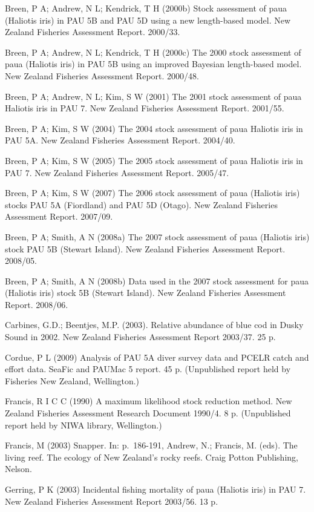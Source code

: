 \documentclass{mpi-plenary}
\theoremstyle{definition}
\theoremstyle{definition}
\theoremstyle{definition}
\theoremstyle{remark}
\begin{document}
Breen, P A; Andrew, N L; Kendrick, T H (2000b) Stock assessment of paua
(Haliotis iris) in PAU 5B and PAU 5D using a new length-based model. New
Zealand Fisheries Assessment Report. 2000/33.

Breen, P A; Andrew, N L; Kendrick, T H (2000c) The 2000 stock assessment
of paua (Haliotis iris) in PAU 5B using an improved Bayesian
length-based model. New Zealand Fisheries Assessment Report. 2000/48.

Breen, P A; Andrew, N L; Kim, S W (2001) The 2001 stock assessment of
paua Haliotis iris in PAU 7. New Zealand Fisheries Assessment Report.
2001/55.

Breen, P A; Kim, S W (2004) The 2004 stock assessment of paua Haliotis
iris in PAU 5A. New Zealand Fisheries Assessment Report. 2004/40.

Breen, P A; Kim, S W (2005) The 2005 stock assessment of paua Haliotis
iris in PAU 7. New Zealand Fisheries Assessment Report. 2005/47.

Breen, P A; Kim, S W (2007) The 2006 stock assessment of paua (Haliotis
iris) stocks PAU 5A (Fiordland) and PAU 5D (Otago). New Zealand
Fisheries Assessment Report. 2007/09.

Breen, P A; Smith, A N (2008a) The 2007 stock assessment of paua
(Haliotis iris) stock PAU 5B (Stewart Island). New Zealand Fisheries
Assessment Report. 2008/05.

Breen, P A; Smith, A N (2008b) Data used in the 2007 stock assessment
for paua (Haliotis iris) stock 5B (Stewart Island). New Zealand
Fisheries Assessment Report. 2008/06.

Carbines, G.D.; Beentjes, M.P. (2003). Relative abundance of blue cod in
Dusky Sound in 2002. New Zealand Fisheries Assessment Report 2003/37. 25
p.

Cordue, P L (2009) Analysis of PAU 5A diver survey data and PCELR catch
and effort data. SeaFic and PAUMac 5 report. 45 p. (Unpublished report
held by Fisheries New Zealand, Wellington.)

Francis, R I C C (1990) A maximum likelihood stock reduction method. New
Zealand Fisheries Assessment Research Document 1990/4. 8 p. (Unpublished
report held by NIWA library, Wellington.)

Francis, M (2003) Snapper. In: p.~186-191, Andrew, N.; Francis, M.
(eds). The living reef. The ecology of New Zealand's rocky reefs. Craig
Potton Publishing, Nelson.

Gerring, P K (2003) Incidental fishing mortality of paua (Haliotis iris)
in PAU 7. New Zealand Fisheries Assessment Report 2003/56. 13 p.
\end{document}
